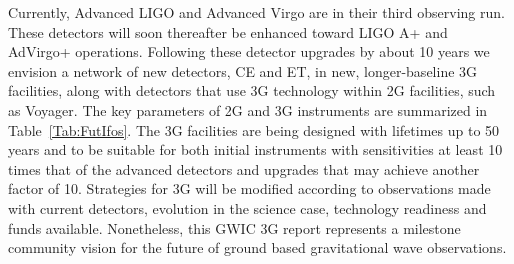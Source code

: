 Currently, Advanced LIGO and Advanced Virgo are in their third observing run. These detectors will soon thereafter be enhanced toward LIGO A+ and AdVirgo+ operations. Following these detector upgrades by about 10 years we envision a network of new detectors, CE and ET, in new, longer-baseline 3G facilities, along with detectors that use 3G technology within 2G facilities, such as Voyager.
The key parameters of 2G and 3G instruments are summarized in Table~\ref{Tab:FutIfos}.
The 3G facilities are being designed with lifetimes up to 50 years and to be suitable for both initial instruments with sensitivities at least 10 times that of the advanced detectors and upgrades that may achieve another factor of 10.
Strategies for 3G will be modified according to observations made with current detectors, evolution in the science case, technology readiness and funds available. Nonetheless, this GWIC 3G report represents a milestone community vision for the future of ground based gravitational wave observations. 






